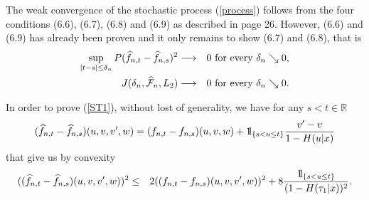 \documentclass[12pt]{article}
\def\ind{ {{\rm 1}\hskip-2.2pt{\rm l}}}
\begin{document}
The weak convergence of the stochastic process (\ref{process}) follows from the four conditions (6.6), (6.7), (6.8) and (6.9) as described in \cite{Escobar2019} page 26. However, (6.6) and (6.9) has already been proven and it only remains to show (6.7) and (6.8), that is
\begin{eqnarray}
\label{ST1}
\sup_{|t-s|\leq \delta_n} P(\widehat{f}_{n,t}-\widehat{f}_{n,s})^2 &\longrightarrow& 0 \mbox{ for every $\delta_n \searrow 0$,}\\
\label{ST2}
J(\delta_n, \widehat{{\cal F}}_n, L_2)&\longrightarrow& 0 \mbox{ for every $\delta_n \searrow 0$.}
\end{eqnarray}

In order to prove (\ref{ST1}), without lost of generality, we have for any $s<t\in\mathbb{R}$
\begin{eqnarray*}
(\widehat{f}_{n,t}-\widehat{f}_{n,s})(u,v,v',w)=(f_{n,t}-f_{n,s})(u,v,w)+\ind_{\{s<u\leq t\}}\dfrac{v'-v}{1-H(u|x)}
\end{eqnarray*}
that give us by convexity
\begin{eqnarray*}
((\widehat{f}_{n,t}-\widehat{f}_{n,s})(u,v,v',w))^2&\leq& 2((f_{n,t}-f_{n,s})(u,v,v',w))^2+8\dfrac{\ind_{\{s<u\leq t\}}}{(1-H(\tau_1|x))^2}.
\end{eqnarray*}
\end{document}
